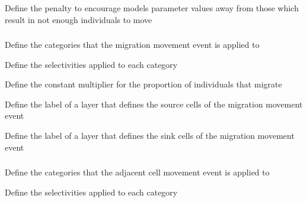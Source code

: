  {Define the penalty to encourage models parameter values away from those which result in not enough individuals to move}

\subsubsection[Migration movement]{}

 {Define the categories that the migration movement event is applied to}

 {Define the selectivities applied to each category}

 {Define the constant multiplier for the proportion of individuals that migrate}

 {Define the label of a layer that defines the source cells of the migration movement event}

 {Define the label of a layer that defines the sink cells of the migration movement event}

\subsubsection[Adjacent cell movement]{}

 {Define the categories that the adjacent cell movement event is applied to}

 {Define the selectivities applied to each category}

